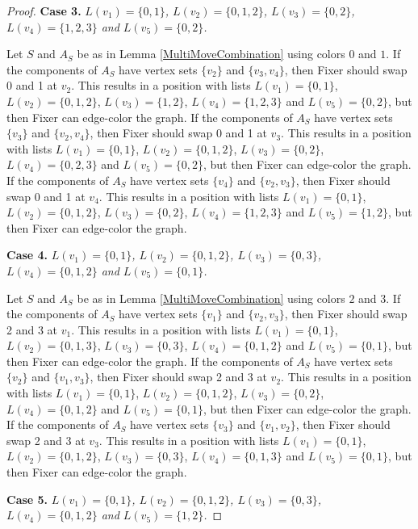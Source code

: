 \documentclass[12pt]{amsart}
\theoremstyle{plain}
\theoremstyle{definition}
\theoremstyle{remark}
\begin{document}
\begin{proof}
\noindent\textbf{Case 3.  }\textit{$L(v_1) = \{0, 1\}$, $L(v_2) = \{0, 1, 2\}$, $L(v_3) = \{0, 2\}$, $L(v_4) = \{1, 2, 3\}$ and $L(v_5) = \{0, 2\}$.}

Let $S$ and $A_S$ be as in Lemma \ref{MultiMoveCombination} using colors $0$ and $1$. If the components of $A_S$ have vertex sets $\{v_2\}$ and $\{v_3, v_4\}$, then Fixer should swap 0 and 1 at $v_2$. This results in a position with lists $L(v_1) = \{0, 1\}$, $L(v_2) = \{0, 1, 2\}$, $L(v_3) = \{1, 2\}$, $L(v_4) = \{1, 2, 3\}$ and $L(v_5) = \{0, 2\}$, but then Fixer can edge-color the graph.
If the components of $A_S$ have vertex sets $\{v_3\}$ and $\{v_2, v_4\}$, then Fixer should swap 0 and 1 at $v_3$. This results in a position with lists $L(v_1) = \{0, 1\}$, $L(v_2) = \{0, 1, 2\}$, $L(v_3) = \{0, 2\}$, $L(v_4) = \{0, 2, 3\}$ and $L(v_5) = \{0, 2\}$, but then Fixer can edge-color the graph.
If the components of $A_S$ have vertex sets $\{v_4\}$ and $\{v_2, v_3\}$, then Fixer should swap 0 and 1 at $v_4$. This results in a position with lists $L(v_1) = \{0, 1\}$, $L(v_2) = \{0, 1, 2\}$, $L(v_3) = \{0, 2\}$, $L(v_4) = \{1, 2, 3\}$ and $L(v_5) = \{1, 2\}$, but then Fixer can edge-color the graph.

\noindent\textbf{Case 4.  }\textit{$L(v_1) = \{0, 1\}$, $L(v_2) = \{0, 1, 2\}$, $L(v_3) = \{0, 3\}$, $L(v_4) = \{0, 1, 2\}$ and $L(v_5) = \{0, 1\}$.}

Let $S$ and $A_S$ be as in Lemma \ref{MultiMoveCombination} using colors $2$ and $3$. If the components of $A_S$ have vertex sets $\{v_1\}$ and $\{v_2, v_3\}$, then Fixer should swap 2 and 3 at $v_1$. This results in a position with lists $L(v_1) = \{0, 1\}$, $L(v_2) = \{0, 1, 3\}$, $L(v_3) = \{0, 3\}$, $L(v_4) = \{0, 1, 2\}$ and $L(v_5) = \{0, 1\}$, but then Fixer can edge-color the graph.
If the components of $A_S$ have vertex sets $\{v_2\}$ and $\{v_1, v_3\}$, then Fixer should swap 2 and 3 at $v_2$. This results in a position with lists $L(v_1) = \{0, 1\}$, $L(v_2) = \{0, 1, 2\}$, $L(v_3) = \{0, 2\}$, $L(v_4) = \{0, 1, 2\}$ and $L(v_5) = \{0, 1\}$, but then Fixer can edge-color the graph.
If the components of $A_S$ have vertex sets $\{v_3\}$ and $\{v_1, v_2\}$, then Fixer should swap 2 and 3 at $v_3$. This results in a position with lists $L(v_1) = \{0, 1\}$, $L(v_2) = \{0, 1, 2\}$, $L(v_3) = \{0, 3\}$, $L(v_4) = \{0, 1, 3\}$ and $L(v_5) = \{0, 1\}$, but then Fixer can edge-color the graph.

\noindent\textbf{Case 5.  }\textit{$L(v_1) = \{0, 1\}$, $L(v_2) = \{0, 1, 2\}$, $L(v_3) = \{0, 3\}$, $L(v_4) = \{0, 1, 2\}$ and $L(v_5) = \{1, 2\}$.}


\end{proof}
\end{document}
